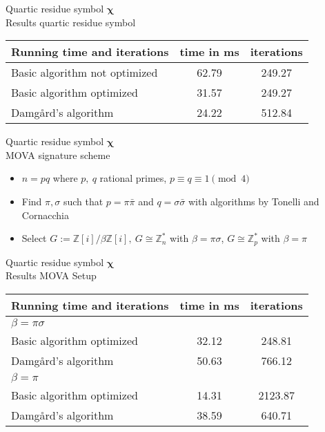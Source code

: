 \documentclass[a4, landscape, slidesonly]{seminar}
\renewcommand{\emph}[1]{{\color{emphcolor} #1}}
\newcommand{\slidetitle}[1]{{\large \color{titlecolor} #1}}
\begin{document}
\begin{slide}
\slidetitle{Quartic residue symbol $\mathbf{\chi}$}
\\[0.8cm]
\emph{Results quartic residue symbol}\\
 \begin{table}[htb] 
 \begin{tabular}{|l c c|} 
 \hline 
 Running time and iterations &  {time in ms} &  {iterations}\\ 
 \hline  
 Basic algorithm not optimized & 62.79 & 249.27\\
 Basic algorithm optimized & 31.57 & 249.27\\
 Damg\aa rd's algorithm  &  24.22 & 512.84\\
 \hline 
 \end{tabular}
 \end{table}  
\end{slide}
\begin{slide}
\slidetitle{Quartic residue symbol $\mathbf{\chi}$}
\\[0.8cm]
\emph{MOVA signature scheme}
\begin{itemize}
\item $n = pq$ where $p,~q$ rational primes, $p\equiv q\equiv 1 \pmod 4$
\item Find $\pi,\sigma$ such that $p=\pi\bar{\pi}$ and $q = \sigma\bar{\sigma}$ with algorithms by Tonelli and Cornacchia
\item Select $G := \mathbb{Z}[i]/\beta\mathbb{Z}[i],~ G \cong \mathbb{Z}_n^*$ with $\beta= \pi \sigma$, $G \cong \mathbb{Z}_p^*$ with $\beta= \pi$
\end{itemize}
\end{slide}
\begin{slide}
\slidetitle{Quartic residue symbol $\mathbf{\chi}$}
\\[0.8cm]
\emph{Results MOVA Setup}\\
 \begin{table}[htb]  
 \begin{tabular}{|l c c|} 
 \hline 
Running time and iterations&  {time in ms} &  {iterations}\\ 
 \hline  
 $\beta= \pi \sigma$ & &\\
 \hline
 Basic algorithm optimized & 32.12 & 248.81\\
 Damg\aa rd's algorithm  &  50.63 & 766.12\\
 \hline  
 $\beta= \pi$ & &\\
 \hline
 Basic algorithm optimized & 14.31 & 2123.87\\
 Damg\aa rd's algorithm  &  38.59 & 640.71\\
 \hline 
 \end{tabular}
 \end{table}  
\end{slide}
\end{document}
